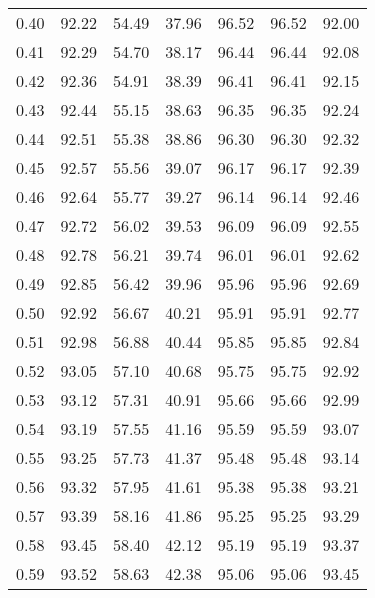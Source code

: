 \begin{tabular}{|c|c|c|c|c|c|c|}
      0.40 &     92.22 &     54.49 &      37.96 &   96.52 &      96.52 &         92.00 \\
      0.41 &     92.29 &     54.70 &      38.17 &   96.44 &      96.44 &         92.08 \\
      0.42 &     92.36 &     54.91 &      38.39 &   96.41 &      96.41 &         92.15 \\
      0.43 &     92.44 &     55.15 &      38.63 &   96.35 &      96.35 &         92.24 \\
      0.44 &     92.51 &     55.38 &      38.86 &   96.30 &      96.30 &         92.32 \\
      0.45 &     92.57 &     55.56 &      39.07 &   96.17 &      96.17 &         92.39 \\
      0.46 &     92.64 &     55.77 &      39.27 &   96.14 &      96.14 &         92.46 \\
      0.47 &     92.72 &     56.02 &      39.53 &   96.09 &      96.09 &         92.55 \\
      0.48 &     92.78 &     56.21 &      39.74 &   96.01 &      96.01 &         92.62 \\
      0.49 &     92.85 &     56.42 &      39.96 &   95.96 &      95.96 &         92.69 \\
      0.50 &     92.92 &     56.67 &      40.21 &   95.91 &      95.91 &         92.77 \\
      0.51 &     92.98 &     56.88 &      40.44 &   95.85 &      95.85 &         92.84 \\
      0.52 &     93.05 &     57.10 &      40.68 &   95.75 &      95.75 &         92.92 \\
      0.53 &     93.12 &     57.31 &      40.91 &   95.66 &      95.66 &         92.99 \\
      0.54 &     93.19 &     57.55 &      41.16 &   95.59 &      95.59 &         93.07 \\
      0.55 &     93.25 &     57.73 &      41.37 &   95.48 &      95.48 &         93.14 \\
      0.56 &     93.32 &     57.95 &      41.61 &   95.38 &      95.38 &         93.21 \\
      0.57 &     93.39 &     58.16 &      41.86 &   95.25 &      95.25 &         93.29 \\
      0.58 &     93.45 &     58.40 &      42.12 &   95.19 &      95.19 &         93.37 \\
      0.59 &     93.52 &     58.63 &      42.38 &   95.06 &      95.06 &         93.45 \\

\end{tabular}
